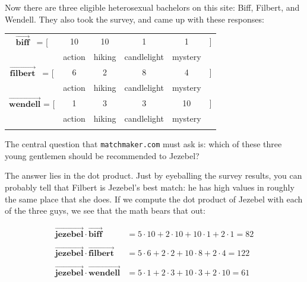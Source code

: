 
Now there are three eligible heterosexual bachelors on this site: Biff,
Filbert, and Wendell. They also took the survey, and came up with these
responses:

\begin{center}
\begin{tabular}{cccccc}
$\overrightarrow{\textbf{biff}}$ \quad \ = [ & 10 & 10 & 1 & 1 & ] \\
& \scriptsize{action} & \scriptsize{hiking} & \scriptsize{candlelight} &
\scriptsize{mystery} & \medskip \\

$\overrightarrow{\textbf{filbert}}$ \ = [ & 6 & 2 & 8 & 4 & ] \\
& \scriptsize{action} & \scriptsize{hiking} & \scriptsize{candlelight} &
\scriptsize{mystery} & \medskip \\

$\overrightarrow{\textbf{wendell}}$ = [ & 1 & 3 & 3 & 10 & ] \\
& \scriptsize{action} & \scriptsize{hiking} & \scriptsize{candlelight} &
\scriptsize{mystery} & \\
\normalsize
\end{tabular}
\end{center}
\vspace{-.15in}

The central question that \texttt{matchmaker.com} must ask is: which of these
three young gentlemen should be recommended to Jezebel?

\smallskip

The answer lies in the dot product. Just by eyeballing the survey results, you
can probably tell that Filbert is Jezebel's best match: he has high values in
roughly the same place that she does. If we compute the dot product of Jezebel
with each of the three guys, we see that the math bears that out:

\begin{align*}
\overrightarrow{\textbf{jezebel}} \cdot \overrightarrow{\textbf{biff}} &=
5 \cdot 10 + 2 \cdot 10 + 10 \cdot 1 + 2 \cdot 1 = 82 \\
\\
\overrightarrow{\textbf{jezebel}} \cdot \overrightarrow{\textbf{filbert}} &=
5 \cdot 6 + 2 \cdot 2 + 10 \cdot 8 + 2 \cdot 4 = 122 \\
\\
\overrightarrow{\textbf{jezebel}} \cdot \overrightarrow{\textbf{wendell}} &=
5 \cdot 1 + 2 \cdot 3 + 10 \cdot 3 + 2 \cdot 10 = 61 \\
\end{align*}

